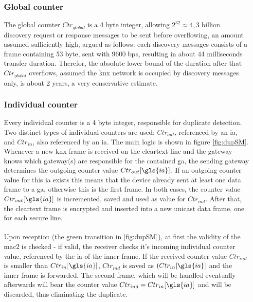 \subsubsection{Global counter}\label{ctrInd}
The global counter $Ctr_{global}$ is a 4 byte integer, allowing $2^{32} \approx 4,3$ billion discovery request or response messages to be sent before overflowing,
an amount assumed sufficiently high, argued as follows:
each discovery messages consists of a frame containing 53 byte, sent with 9600 \gls{bps}, resulting in about 44 milliseconds transfer duration. Therefor,
the absolute lower bound of the duration after that $Ctr_{global}$ overflows, assumed the \gls{knx} network is occupied by discovery messages only,
is about 2 years, a very conservative estimate.

\subsubsection{Individual counter}\label{ctrInd}

Every individual counter is a 4 byte integer, responsible for duplicate detection. Two distinct types of individual counters are used: $Ctr_{out}$, referenced
by an \gls{ia}, and $Ctr_{in}$, also referenced by an \gls{ia}.
The main logic is shown in figure \ref{fig:dupSM}.
\\
Whenever a new \gls{knx} frame is received on the cleartext line and the gateway knows which gateway(s) are responsible for the
contained \gls{ga}, the sending gateway determines the outgoing counter value $Ctr_{out}[\gls{ia}]$. If an outgoing counter value for
this \gls{ia} exists 
this means that the device already sent at least one data frame to a \gls{ga}, otherwise this is the first frame. In both cases,
the counter value $Ctr_{out}[\gls{ia}]$ is incremented, saved and used as value for $Ctr_{ind}$. After that, the cleartext frame is
encrypted and inserted into a new unicast data frame, one for each secure line.
\\
\\
Upon reception (the green transition in \ref{fig:dupSM}), at first the validity of the \gls{mac2} is checked - if valid, the receiver checks it's incoming
individual counter value, referenced by the \gls{ia} of the inner frame. If the received counter value $Ctr_{ind}$ is smaller than $Ctr_{in}[\gls{ia}]$,
 $Ctr_{ind}$ is saved as $(Ctr_{in}[\gls{ia}]$ and the inner frame is forwarded. The second frame, which will be handled eventually 
afterwards will bear the counter value $Ctr_{ind} = Ctr_{in}[\gls{ia}]$ and will be discarded, thus eliminating the duplicate.

